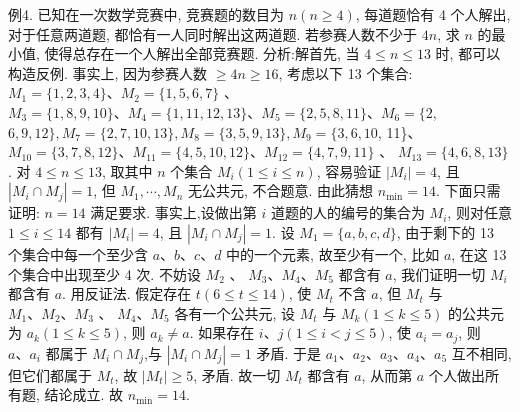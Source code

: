 例4. 已知在一次数学竞赛中, 竞赛题的数目为 $n(n \geqslant 4)$, 每道题恰有 4 个人解出, 对于任意两道题, 都恰有一人同时解出这两道题.
若参赛人数不少于 $4 n$, 求 $n$ 的最小值, 使得总存在一个人解出全部竞赛题.
分析:解首先, 当 $4 \leqslant n \leqslant 13$ 时, 都可以构造反例.
事实上, 因为参赛人数 $\geqslant 4 n \geqslant 16$, 考虑以下 13 个集合: $M_1=\{1,2,3,4\} 、 M_2=\{1,5,6,7\}$ 、 $M_3=\{1,8,9,10\} 、 M_4=\{1,11,12,13\} 、 M_5=\{2,5,8,11\} 、 M_6=\{2$, $6,9,12\}, M_7=\{2,7,10,13\}, M_8=\{3,5,9,13\}, M_9=\{3,6,10$, 11\}、 $M_{10}=\{3,7,8,12\} 、 M_{11}=\{4,5,10,12\} 、 M_{12}=\{4,7,9,11\}$ 、 $M_{13}=\{4,6,8,13\}$. 对 $4 \leqslant n \leqslant 13$, 取其中 $n$ 个集合 $M_i(1 \leqslant i \leqslant n)$, 容易验证 $\left|M_i\right|=4$, 且 $\left|M_i \cap M_j\right|=1$, 但 $M_1, \cdots, M_n$ 无公共元, 不合题意.
由此猜想 $n_{\min }=14$.
下面只需证明: $n=14$ 满足要求.
事实上,设做出第 $i$ 道题的人的编号的集合为 $M_i$, 则对任意 $1 \leqslant i \leqslant 14$ 都有 $\left|M_i\right|=4$, 且 $\left|M_i \cap M_j\right|=1$. 设 $M_1=\{a, b, c, d\}$, 由于剩下的 13 个集合中每一个至少含 $a 、 b 、 c 、 d$ 中的一个元素, 故至少有一个, 比如 $a$, 在这 13 个集合中出现至少 4 次.
不妨设 $M_2$ 、 $M_3 、 M_4 、 M_5$ 都含有 $a$, 我们证明一切 $M_i$ 都含有 $a$.
用反证法.
假定存在 $t(6 \leqslant t \leqslant 14)$, 使 $M_t$ 不含 $a$, 但 $M_t$ 与 $M_1 、 M_2 、 M_3$ 、 $M_4 、 M_5$ 各有一个公共元, 设 $M_t$ 与 $M_k(1 \leqslant k \leqslant 5)$ 的公共元为 $a_k(1 \leqslant k \leqslant 5)$, 则 $a_k \neq a$. 如果存在 $i 、 j(1 \leqslant i<j \leqslant 5)$, 使 $a_i=a_j$, 则 $a 、 a_i$ 都属于
$M_i \cap M_j$,与 $\left|M_i \cap M_j\right|=1$ 矛盾.
于是 $a_1 、 a_2 、 a_3 、 a_4 、 a_5$ 互不相同,但它们都属于 $M_t$, 故 $\left|M_t\right| \geqslant 5$, 矛盾.
故一切 $M_t$ 都含有 $a$, 从而第 $a$ 个人做出所有题, 结论成立.
故 $n_{\min }=14$.



